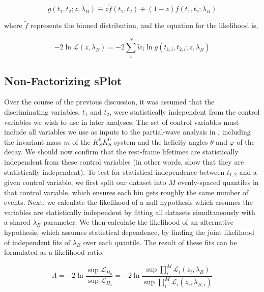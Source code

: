\begin{equation}
  g(t_1, t_2; z, \lambda_B) \equiv z \tilde{f}(t_1, t_2) + (1-z) f(t_1, t_2; \lambda_B)
  \label{eq:splot-mixture}
\end{equation}

where $\tilde{f}$ represents the binned distribution, and the equation for the likelihood is,

\begin{equation}
  -2\ln\mathcal{L}(z,  \lambda_B) = -2\sum_i^N \tilde{w}_i \ln g(t_{1,i}, t_{2,i}; z, \lambda_B)
  \label{eq:splot-nll}
\end{equation}

\subsection{Non-Factorizing sPlot}\label{sec:non-factorizing-splot}

Over the course of the previous discussion, it was assumed that the discriminating variables, $t_1$ and $t_2$, were statistically independent from the control variables we wish to use in later analyses. The set of control variables must include all variables we use as inputs to the partial-wave analysis in , including the invariant mass $m$ of the $K_S^0K_S^0$ system and the helicity angles $\theta$ and $\varphi$ of the decay. We should now confirm that the rest-frame lifetimes are statistically independent from these control variables (in other words, show that they are statistically independent). To test for statistical independence between $t_{1,2}$ and a given control variable, we first split our dataset into $M$ evenly-spaced quantiles in that control variable, which ensures each bin gets roughly the same number of events. Next, we calculate the likelihood of a null hypothesis which assumes the variables are statistically independent by fitting all datasets simultaneously with a shared $\lambda_B$ parameter. We then calculate the likelihood of an alternative hypothesis, which assumes statistical dependence, by finding the joint likelihood of independent fits of $\lambda_B$ over each quantile. The result of these fits can be formulated as a likelihood ratio,

\begin{equation}
  \Lambda = -2\ln\frac{\sup \mathcal{L}_{H_0}}{\sup \mathcal{L}_{H_1}} = -2\ln\frac{\sup \prod_i^M \mathcal{L}_i(z_i, \lambda_B)}{\sup \prod_i^M \mathcal{L}_i(z_i, \lambda_{B,i})}
  \label{eq:independence-test}
\end{equation}

